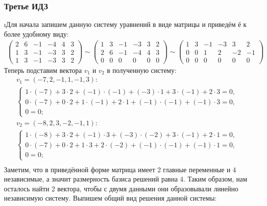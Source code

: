 \subsubsection{Третье ИДЗ}

\i Для начала запишем данную систему уравнений в виде матрицы и приведём ё к более удобному виду:
\begin{gather*}
    \begin{pmatrix}
        2 & 6 & -1 & -4 & 4 & 3 \\
        1 & 3 & -1 & -3 & 3 & 2 \\
        1 & 3 & -1 & -3 & 3 & 2
    \end{pmatrix} \sim
    \begin{pmatrix}
        1 & 3 & -1 & -3 & 3 & 2 \\
        2 & 6 & -1 & -4 & 4 & 3 \\
        0 & 0 & 0 & 0 & 0 & 0
    \end{pmatrix} \sim 
    \begin{pmatrix}
        1 & 3 & -1 & -3 & 3 & 2 \\
        0 & 0 & 1 & 2 & -2 & -1 \\
        0 & 0 & 0 & 0 & 0 & 0
    \end{pmatrix}
\end{gather*}
Теперь подставим вектора $v_1$ и $v_2$ в полученную систему:
\begin{gather*}
    v_1 = (-7, 2, -1, 1, -1, 3):\\
    \begin{cases}
        1 \cdot (-7) + 3 \cdot 2 + (-1) \cdot (-1) + (-3) \cdot 1 + 3 \cdot (-1) + 2 \cdot 3 = 0,\\
        0 \cdot (-7) + 0 \cdot 2 + 1 \cdot (-1) + 2 \cdot 1 + (-1) \cdot (-1) + (-1) \cdot 3 = 0,\\
        0 = 0; 
    \end{cases}\\
    v_2 = (-8, 2, 3, -2, -1, 1):\\
    \begin{cases}
        1 \cdot (-8) + 3 \cdot 2 + (-1) \cdot 3 + (-3) \cdot (-2) + 3 \cdot (-1) + 2 \cdot 1 = 0,\\
        0 \cdot (-7) + 0 \cdot 2 + 1 \cdot 3 + 2 \cdot (-2) + (-1) \cdot (-1) + (-1) \cdot 1 = 0,\\
        0 = 0; 
    \end{cases}\\
\end{gather*}
Заметим, что в приведённой форме матрица имеет 2 главные переменные и 4 независимые, а значит размерность базиса решений равна 4. Таким образом, нам осталось найти 2 вектора, чтобы с двумя данными они образовывали линейно независимую систему. Выпишем общий вид решения данной системы:

